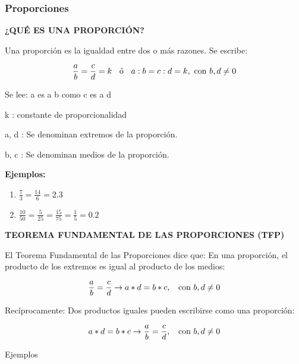\begin{frame}
    \frametitle{Proporciones}

\textbf{¿QUÉ ES UNA PROPORCIÓN?}

\hfill

Una proporción es la igualdad entre dos o más
razones. Se escribe:

$$
\frac{a}{b} = \frac{c}{d}=k \hspace{2mm}  \text{ ó } \hspace{2mm} a:b = c:d = k, \text{ con } b,d \neq 0
$$

Se lee: {\color{red} a es a b como c es a d }

{\color{red} k} : constante de proporcionalidad

{\color{red} a, d} : Se denominan extremos de la proporción.

{\color{red} b, c} : Se denominan medios de la proporción.

\hfill

\textbf{Ejemplos:}

\begin{enumerate}
\item $\frac{7}{3} = \frac{14}{6}= 2.3$
\item $\frac{10}{50} = \frac{5}{25} = \frac{15}{75} = \frac{1}{5} = 0.2 $
\end{enumerate}
\end{frame}

\begin{frame}

\textbf{TEOREMA FUNDAMENTAL DE LAS PROPORCIONES (TFP)}

\hfill

El Teorema Fundamental de las Proporciones
dice que: En una proporción, el producto de los
extremos es igual al producto de los medios:

$$
\frac{a}{b} = \frac{c}{d} \to a*d = b*c, \hspace{2mm} \text{ con } b,d \neq 0
$$

Recíprocamente: Dos productos iguales pueden
escribirse como una proporción:

$$
a*d = b*c \to \frac{a}{b} = \frac{c}{d}, \hspace{2mm} \text{  con }  b,d \neq 0
$$


\hfill

Ejemplos



\end{frame}


